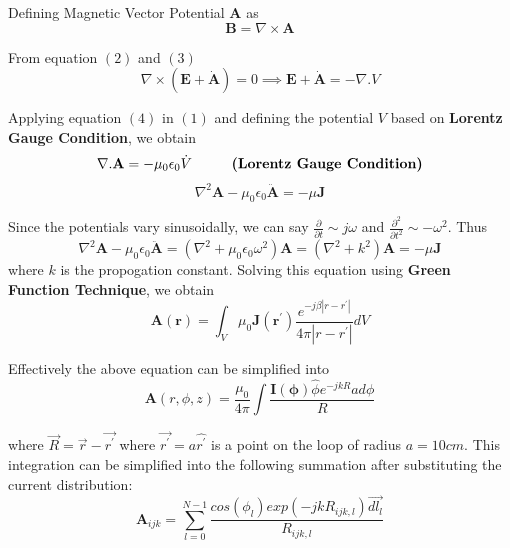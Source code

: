 \documentclass[12pt, a4paper]{report}
\begin{document}
Defining Magnetic Vector Potential $\mathbf{A}$ as 
\begin{equation}
\mathbf{B} = \nabla \times \mathbf{A}  
\end{equation}

From equation $(2)$ and $(3)$
\begin{equation}
\nabla \times (\mathbf{E} + \dot{\mathbf{A}}) = 0 \implies \mathbf{E} + \dot{\mathbf{A}} = -\nabla.V    
\end{equation}

Applying equation $(4)$ in $(1)$ and defining the potential $V$ based on \textbf{Lorentz Gauge Condition}, we obtain
\begin{equation*}
\nabla. \mathbf{A} = - \mu_0 \epsilon_0 \dot{V} \hspace{1 cm} \textbf{(Lorentz Gauge Condition)} 
\end{equation*}
\begin{equation*}
\nabla^2 \mathbf{A} - \mu_0 \epsilon_0 \ddot{\mathbf{A}} = -\mu \mathbf{J}
\end{equation*}

Since the potentials vary sinusoidally, we can say $\frac{\partial}{\partial t} \sim j\omega$ and $\frac{\partial^2}{\partial t^2} \sim -\omega^2$. Thus
\begin{equation*}
\nabla^2 \mathbf{A} - \mu_0 \epsilon_0 \ddot{\mathbf{A}} = (\nabla^2 + \mu_0 \epsilon_0 \omega^2) {\mathbf{A}} = (\nabla^2 + k^2)\mathbf{A} = -\mu \mathbf{J}
\end{equation*} where $k$ is the propogation constant.
Solving this equation using \textbf{Green Function Technique}, we obtain
\begin{equation*}
\mathbf{A(r)} = \int_V \mu_0 \mathbf{J(r^{'})} \frac{e^{-j \beta |r - r^{'}|}}{4\pi|r - r^{'}|} dV
\end{equation*}

Effectively the above equation can be simplified into 
\begin{equation*}
\mathbf{A}(r, \phi, z) = \frac{\mu_0}{4 \pi} \int \frac{\mathbf{I(\phi)}\hat{\phi}e^{-jkR}a d\phi}{R}
\end{equation*}

where $\vec{R} = \vec{r} - \vec{r^{'}}$ where $\vec{r^{'}} = a\hat{r^{'}}$ is a point on the loop of radius $a = 10cm$. This integration can be simplified into the following summation after substituting the current distribution:
\begin{equation}
\mathbf{A}_{ijk} = \sum_{l=0}^{N-1} \frac{cos(\phi_l)exp(-jkR_{ijk,l})\vec{dl_l}}{R_{ijk,l}}
\end{equation}
\end{document}
